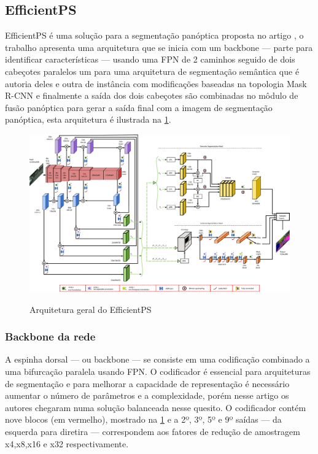 \subsection{EfficientPS}

EfficientPS é uma solução para a segmentação panóptica proposta no artigo , o trabalho apresenta uma arquitetura que se inicia com um backbone — parte para identificar características — usando uma FPN de 2 caminhos seguido de dois cabeçotes paralelos um para uma arquitetura de segmentação semântica que é autoria deles e outra de instância com modificações baseadas na topologia Mask R-CNN e finalmente a saída dos dois cabeçotes são combinadas no môdulo de fusão panóptica para gerar a saída final com a imagem de segmentação panóptica, esta arquitetura é ilustrada na \cref{fig:arqEP}.

\begin{figure}[H]
	\caption{Arquitetura geral do EfficientPS}
	\centering %
	\includegraphics[width=15cm]{figures/arqEP.jpg} %
	\label{fig:arqEP}
\end{figure}

\subsubsection*{Backbone da rede}
A espinha dorsal — ou backbone — se consiste em uma codificação combinado a uma bifurcação paralela usando FPN. O codificador é essencial para arquiteturas de segmentação e para melhorar a capacidade de representação é necessário aumentar o número de parâmetros e a complexidade, porém nesse artigo os autores chegaram numa solução balanceada nesse quesito. O codificador contém nove blocos (em vermelho), mostrado na \cref{fig:arqEP} e a 2º, 3º, 5º e 9º saídas — da esquerda para diretira — correspondem aos fatores de redução de amostragem x4,x8,x16 e x32 respectivamente.


